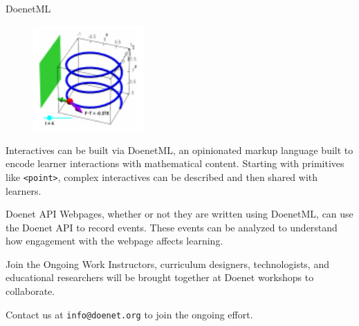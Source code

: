 \begin{sectionblock}{DoenetML}

  \begin{figure}
    \includegraphics[width=0.38\textwidth]{vector-field.pdf}
  \end{figure}
  Interactives can be built via DoenetML, an opinionated markup
  language built to encode learner interactions with mathematical
  content.  Starting with primitives like \texttt{<point>}, complex
  interactives can be described and then shared with learners.

\end{sectionblock}

\vspace{1ex}

\begin{sectionblock}{Doenet API}
  Webpages, whether or not they are written using DoenetML, can use
  the Doenet API to record events.  These events can be analyzed to
  understand how engagement with the webpage affects learning.
  
\end{sectionblock}

\vspace{1ex}

\begin{sectionblock}{Join the Ongoing Work}
  Instructors, curriculum designers, technologists, and educational
  researchers will be brought together at Doenet workshops to
  collaborate.

  \vspace{1ex}Contact us at \texttt{info@doenet.org} to join the
  ongoing effort.
\end{sectionblock}



